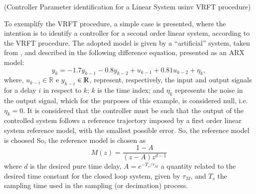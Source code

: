 \begin{exmp}(Controller Parameter identification for a Linear System usinv VRFT procedure)
   \label{exm:31}

   To exemplify the VRFT procedure, a simple case is presented, where the intention is to identify a controller for a second order linear system, according to the VRFT procedure. The adopted model is given by a ``artificial'' system, taken from \cite{wei2008}, and described in the following difference equation, presented as an ARX model:
   \begin{equation}
      y_k = -1.7y_{k-1} -0.8y_{k-2} + u_{k-1} + 0.81u_{k-2} + \eta_k,
   \label{eq:sys_ex_1}
   \end{equation}
   where, $u_{k-i} \in \mathbb{R}$ e $y_{k-i}$ $\in \mathbb{R}$, represent, respectively, the input and output signals for a delay $i$ in respect to $k$; $k$ is the time index; and $\eta_k$ represents the noise in the output signal, which for the purposes of this example, is considered null, i.e. $\eta_k=0$.
   It is considered that the controller must be such that the output of the controlled system follows a reference trajectory imposed by a first order linear system reference model, with the smallest possible error. So, the reference model is choosed 
   So, the reference model is chosen as
   \begin{equation}%
      M(z) = \frac{1-A}{(z-A)z^{d-1}}
   \label{eq:Mz}
   \end{equation}
   where $d$ is the desired pure time delay, $A=e^{-T_s/\tau_M}$ a quantity related to the desired time constant for the closed loop system, given by $\tau_M$, and $T_s$ the sampling time used in the sampling (or decimation) process.
   

\end{exmp}
